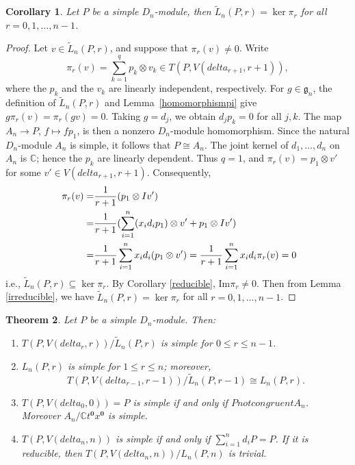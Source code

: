 \documentclass[12pt,a4paper]{amsart}
\def\mg{g}%
\def\delta{delta}%
\def\ncong{not congruent}%
\newtheorem{theorem}{Theorem}[section]
\newtheorem{corollary}[theorem]{Corollary}%
\numberwithin{equation}{section}
\newcommand{\C}{\mathbb C}
\def\mg{\mathfrak{g}}
\def\bo{\mathbf{0}}
\begin{document}
\begin{corollary}\label{ker}
Let $P$ be a simple $D_n$-module, then $\tilde{L}_n(P,r)=\ker \pi_r$ for all $r=0,1,\dots, n-1$.
\end{corollary}
\begin{proof}
Let \(v\in\tilde L_n(P,r)\), and suppose that \(\pi_r(v)\neq0\).
Write
\[
\pi_r(v)=\sum_{k=1}^q p_k\otimes v_k
\in T(P,V(\delta_{r+1},r+1)),
\]
where the \(p_k\) and the \(v_k\) are linearly independent,
respectively. For \(g\in\mg_n\), the definition of
\(\tilde L_n(P,r)\) and Lemma~\ref{homomorphismpi} give $
g\pi_r(v)=\pi_r(gv)=0$.
Taking \(g=d_j\), we obtain \(d_jp_k=0\) for all \(j,k\).
The map \(A_n\to P\), \(f\mapsto fp_1\), is then a nonzero
\(D_n\)-module homomorphism. Since the natural \(D_n\)-module \(A_n\)
is simple, it follows that \(P\cong A_n\). The joint kernel of
\(d_1,\ldots,d_n\) on \(A_n\) is \(\C\); hence the \(p_k\) are
linearly dependent. Thus \(q=1\), and
\(\pi_r(v)=p_1\otimes v'\) for some
\(v'\in V(\delta_{r+1},r+1)\). Consequently,
$$\aligned \
\pi_r(v)=&\frac{1}{r+1}(p_1\otimes Iv')\\
=&\frac{1}{r+1}(\sum^n_{i=1}(x_id_ip_1)\otimes v'+p_1\otimes Iv')\\
=&\frac{1}{r+1}\sum^n_{i=1}x_id_i(p_1\otimes v')
=\frac{1}{r+1}\sum^n_{i=1}x_id_i\pi_r(v)=
0
\endaligned$$
i.e., $\tilde{L}_n(P,r)\subseteq \ker \pi_r$.
By Corollary \ref{reducible}, $\text{Im}\pi_r\neq0$. Then from Lemma \ref{irreducible}, we have $\tilde{L}_n(P,r)=\ker \pi_r$ for all $r=0,1,\dots, n-1$.
\end{proof}

\begin{theorem}\label{remain}
Let \(P\) be a simple \(D_n\)-module. Then:
\begin{enumerate}
\item \(T(P,V(\delta_r,r))/\tilde{L}_n(P,r)\) is simple for
\(0\leq r\leq n-1\).

\item \(L_n(P,r)\) is simple for \(1\leq r\leq n\); moreover,
$$T(P,V(\delta_{r-1},r-1))/\tilde{L}_n(P,r-1)\cong L_n(P,r).$$

\item \(T(P,V(\delta_0,0))=P\) is simple if and only
 if $P\ncong A_n$. Moreover $A_n/\C t^{\bo}x^{\bo}$ is simple.

\item \(T(P,V(\delta_n,n))\) is simple if and only if
\(\sum_{i=1}^n d_iP=P\). If it is reducible, then
\(T(P,V(\delta_n,n))/L_n(P,n)\) is trivial.
\end{enumerate}
\end{theorem}
\end{document}
